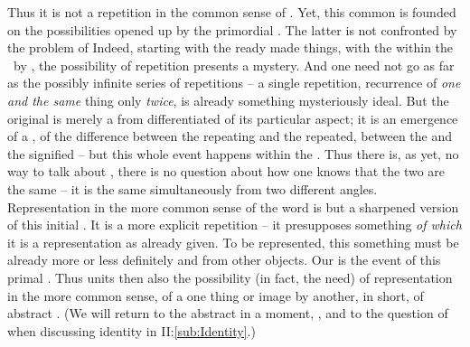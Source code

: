 Thus it is not a repetition in the common sense of . Yet, this common  is founded
  on the possibilities opened up by the 
primordial  . The latter is not confronted by the
problem of  Indeed, starting with the ready made things, with the 
 within the \hoa\ by , the possibility
of repetition presents a mystery. And one need not go as far as the possibly
infinite series of repetitions -- a single repetition, recurrence of {\em one
  and the same} thing only {\em twice}, is already something mysteriously ideal.
But the original  is merely a  from
differentiated  of its particular aspect; it is an emergence of a
, of the difference between the {repeating} and the
{repeated}, between the  and the signified -- but this whole event
happens within the \hoa. Thus there is, as yet, no way to talk about , there is no question about how one knows that the two are the same --
it is the same  simultaneously from two different angles.
Representation in the more common sense of the word
is but a sharpened version of this initial . It is a more
explicit repetition -- it presupposes something {\em of which} it is a
representation as already given. To be represented, this something must be
already more or less definitely and  from other
objects. Our  is the event of this primal .
Thus  units  then also the possibility (in
fact, the need) of representation in the more common sense, of a one
 thing or image by another, in short, of abstract .
(We will return to the abstract  in a moment, , 
and to the question of  when discussing identity in II:\ref{sub:Identity}.)



